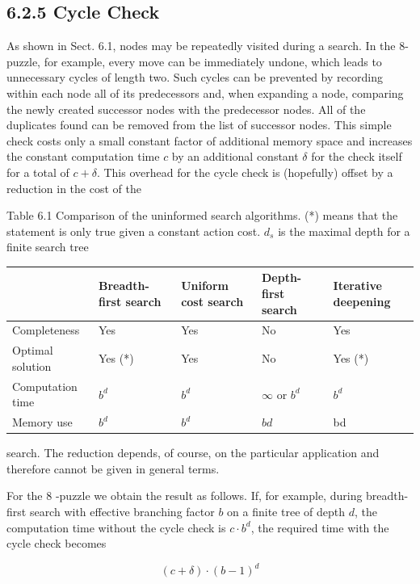 \documentclass[10pt]{book}
\begin{document}
\begin{center}
\subsection*{6.2.5 Cycle Check}
As shown in Sect. 6.1, nodes may be repeatedly visited during a search. In the 8-puzzle, for example, every move can be immediately undone, which leads to unnecessary cycles of length two. Such cycles can be prevented by recording within each node all of its predecessors and, when expanding a node, comparing the newly created successor nodes with the predecessor nodes. All of the duplicates found can be removed from the list of successor nodes. This simple check costs only a small constant factor of additional memory space and increases the constant computation time $c$ by an additional constant $\delta$ for the check itself for a total of $c+\delta$. This overhead for the cycle check is (hopefully) offset by a reduction in the cost of the

Table 6.1 Comparison of the uninformed search algorithms. (*) means that the statement is only true given a constant action cost. $d_{s}$ is the maximal depth for a finite search tree

\begin{center}
\begin{tabular}{|l|l|l|l|l|}
\hline
 & Breadth-first search & Uniform cost search & Depth-first search & Iterative deepening \\
\hline
Completeness & Yes & Yes & No & Yes \\
\hline
Optimal solution & Yes (*) & Yes & No & Yes (*) \\
\hline
Computation time & $b^{d}$ & $b^{d}$ & $\infty$ or $b^{d}$ & $b^{d}$ \\
\hline
Memory use & $b^{d}$ & $b^{d}$ & $b d$ & bd \\
\hline
\end{tabular}
\end{center}

search. The reduction depends, of course, on the particular application and therefore cannot be given in general terms.


For the 8 -puzzle we obtain the result as follows. If, for example, during breadth-first search with effective branching factor $b$ on a finite tree of depth $d$, the computation time without the cycle check is $c \cdot b^{d}$, the required time with the cycle check becomes

$$
(c+\delta) \cdot(b-1)^{d}
$$


\end{center}
\end{document}
